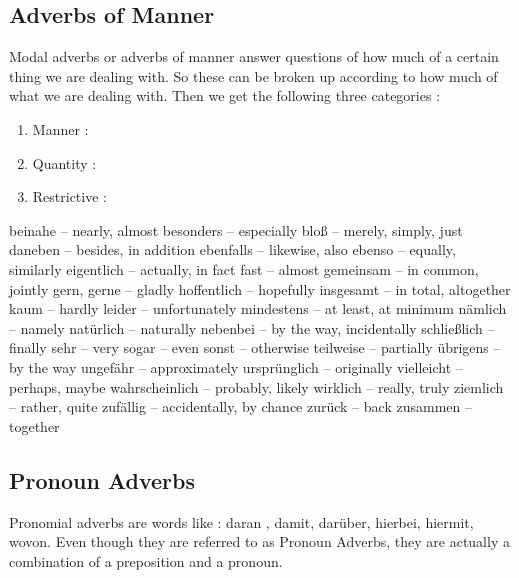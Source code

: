 \documentclass[a4paper,twocolumn,10pt]{article}
\newcommand{\subsectionend}
{
\nolinenumbers
\linenumbers
}
\begin{document}

\subsectionend

\subsection{Adverbs of Manner}
\label{ssec:adverbs_of_manner}
Modal adverbs or adverbs of manner answer questions of how much of a
certain thing we are dealing with. So these can be broken up according to how
much of what we are dealing with. Then we get the following three categories :

\begin{enumerate}[noitemsep]
	\item Manner : 
	\item Quantity :
	\item Restrictive :
\end{enumerate}

beinahe -- nearly, almost
besonders -- especially
bloß -- merely, simply, just
daneben -- besides, in addition
ebenfalls -- likewise, also
ebenso -- equally, similarly
eigentlich -- actually, in fact
fast -- almost
gemeinsam -- in common, jointly
gern, gerne -- gladly
hoffentlich -- hopefully
insgesamt -- in total, altogether
kaum -- hardly
leider -- unfortunately
mindestens -- at least, at minimum
nämlich -- namely
natürlich -- naturally
nebenbei -- by the way, incidentally
schließlich -- finally
sehr -- very
sogar -- even
sonst -- otherwise
teilweise -- partially
übrigens -- by the way
ungefähr -- approximately
ursprünglich -- originally
vielleicht -- perhaps, maybe
wahrscheinlich -- probably, likely
wirklich -- really, truly
ziemlich -- rather, quite
zufällig -- accidentally, by chance
zurück -- back
zusammen -- together



\subsectionend

\subsection{Pronoun Adverbs}
\label{ssec:pronoun_adverbs}

Pronomial adverbs are words like : daran , damit, darüber, hierbei, hiermit,
wovon.  Even though they are referred to as Pronoun Adverbs, they are actually a
combination of a preposition and a pronoun.\\
\end{document}
